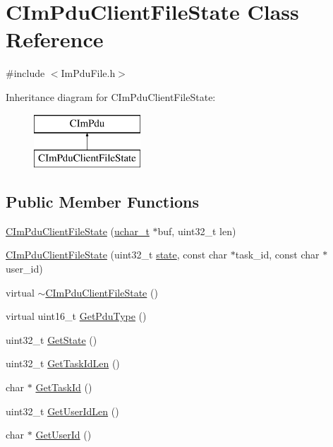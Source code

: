\hypertarget{class_c_im_pdu_client_file_state}{}\section{C\+Im\+Pdu\+Client\+File\+State Class Reference}
\label{class_c_im_pdu_client_file_state}


{\ttfamily \#include $<$Im\+Pdu\+File.\+h$>$}

Inheritance diagram for C\+Im\+Pdu\+Client\+File\+State\+:\begin{figure}[H]
\begin{center}
\leavevmode
\includegraphics[height=2.000000cm]{class_c_im_pdu_client_file_state}
\end{center}
\end{figure}
\subsection*{Public Member Functions}
\begin{DoxyCompactItemize}
\item 
\hyperlink{class_c_im_pdu_client_file_state_ab71c71e0af25ce16bb300962e82a0568}{C\+Im\+Pdu\+Client\+File\+State} (\hyperlink{base_2ostype_8h_a124ea0f8f4a23a0a286b5582137f0b8d}{uchar\+\_\+t} $\ast$buf, uint32\+\_\+t len)
\item 
\hyperlink{class_c_im_pdu_client_file_state_a7677a1ffc1dedf874b9e600339260a40}{C\+Im\+Pdu\+Client\+File\+State} (uint32\+\_\+t \hyperlink{_http_parser_8cpp_adc6e5733fc3c22f0a7b2914188c49c90}{state}, const char $\ast$task\+\_\+id, const char $\ast$user\+\_\+id)
\item 
virtual \hyperlink{class_c_im_pdu_client_file_state_a06ab87b6eec7163dfadc925ef16b7465}{$\sim$\+C\+Im\+Pdu\+Client\+File\+State} ()
\item 
virtual uint16\+\_\+t \hyperlink{class_c_im_pdu_client_file_state_a7127e286761fbe469749e294f13789ba}{Get\+Pdu\+Type} ()
\item 
uint32\+\_\+t \hyperlink{class_c_im_pdu_client_file_state_a4e1c1b86767eebcf253e149f5de12186}{Get\+State} ()
\item 
uint32\+\_\+t \hyperlink{class_c_im_pdu_client_file_state_acb854b3f92c3c2294172d37b74753469}{Get\+Task\+Id\+Len} ()
\item 
char $\ast$ \hyperlink{class_c_im_pdu_client_file_state_a7f2d757b126cbaeff571c0362f994b4c}{Get\+Task\+Id} ()
\item 
uint32\+\_\+t \hyperlink{class_c_im_pdu_client_file_state_a8062bc258edc23f2b3bef75fb92741ac}{Get\+User\+Id\+Len} ()
\item 
char $\ast$ \hyperlink{class_c_im_pdu_client_file_state_a574797c9781daaefb90c8de26b81434c}{Get\+User\+Id} ()
\end{DoxyCompactItemize}
